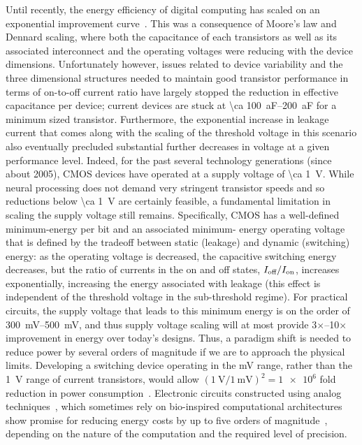 Until recently, the energy efficiency of digital computing has scaled on an exponential improvement curve~\cite{koomey11}.
This was a consequence of Moore's law and Dennard scaling, where both the capacitance of each transistors as well as its associated interconnect and the operating voltages were reducing with the device dimensions.
Unfortunately however, issues related to device variability and the three dimensional structures needed to maintain good transistor performance in terms of on-to-off current ratio have largely stopped the reduction in effective capacitance per device; current devices are stuck at \SIrange{\ca 100}{200}{\atto\farad} for a minimum sized transistor.
Furthermore, the exponential increase in leakage current that comes along with the scaling of the threshold voltage in this scenario also eventually precluded substantial further decreases in voltage at a given performance level.
Indeed, for the past several technology generations (since about 2005), CMOS devices have operated at a supply voltage of \SI{\ca 1}{\volt}.
While neural processing does not demand very stringent transistor speeds and so reductions below \SI{\ca 1}{\volt} are certainly feasible, a fundamental limitation in scaling the supply voltage still remains.
Specifically, CMOS has a well-defined minimum-energy per bit and an associated minimum- energy operating voltage that is defined by the tradeoff between static (leakage) and dynamic (switching) energy:
as the operating voltage is decreased, the capacitive switching energy decreases, but the ratio of currents in the on and off states, $I_{\text{\scriptsize off}}/I_{\text{\scriptsize on}}$, increases exponentially, increasing the energy associated with leakage (this effect is independent of the threshold voltage in the sub-threshold regime).
For practical circuits, the supply voltage that leads to this minimum energy is on the order of \SIrange{300}{500}{\milli\volt}, and thus supply voltage scaling will at most provide 3$\times$--10$\times$ improvement in energy over today's designs.
Thus, a paradigm shift is needed to reduce power by several orders of magnitude if we are to approach the physical limits.
Developing a switching device operating in the \si{\milli\volt} range, rather than the \SI{1}{\volt} range of current transistors, would allow $\left(\SI{1}{\volt}/\SI{1}{\milli\volt}\right)^2=\num{1e6}$ fold reduction in power consumption~\cite{yablonovitch08}.
Electronic circuits constructed using analog techniques~\cite{sarpeshkar98}, which sometimes rely on bio-inspired computational architectures show promise for reducing energy costs by up to five orders of magnitude~\cite{rapoport09,sarpeshkar98,mandal07}, depending on the nature of the computation and the required level of precision.

